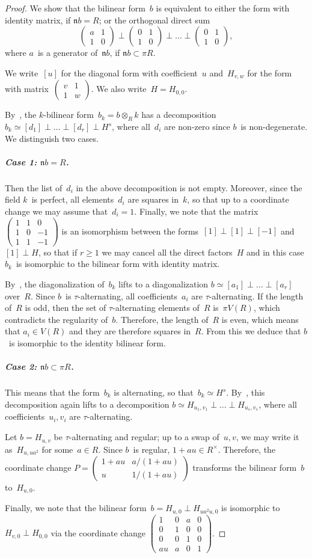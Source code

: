 \documentclass{article}
\def\mat#1{\begin{pmatrix}#1\end{pmatrix}}
\let\fr\mathfrak
\begin{document}
\begin{proof}
We show that the bilinear form~$b$ is equivalent to either the form with
identity matrix, if $\fr n b = R$; or the orthogonal direct sum
\[ \mat{a & 1\\1&0} ⟂ \mat{0 & 1\\1&0} ⟂ … ⟂ \mat {0 & 1\\ 1 & 0}, \]
where $a$~is a generator of~$\fr n b$, if $\fr n b ⊂ π R$.

We write~$[u]$ for the diagonal form with coefficient~$u$ and~$H_{v, w}$ for
the form with matrix~$\mat{v&1\\1&w}$. We also write~$H = H_{0,0}$.

By~\cite[§2]{milnor2}, the $k$-bilinear form~$b_k = b ⊗_R k$ has a
decomposition~$b_k ≃ [d_1] ⟂ … ⟂ [d_r] ⟂ H^s$, where all~$d_i$ are
non-zero since $b$~is non-degenerate. We distinguish two cases.

\subparagraph{Case 1: $\fr n b = R$.}
Then the list of~$d_i$ in the above
decomposition is not empty. Moreover, since the field $k$~is perfect, all
elements~$d_i$ are squares in~$k$, so that up to a coordinate change we
may assume that~$d_i = 1$. Finally, we note that the
matrix~$\mat{1&1&0\\1&0&-1\\1&1&-1}$ is an isomorphism between the
forms~$[1] ⟂ [1] ⟂ [-1]$ and~$[1] ⟂ H$, so that if $r ≥ 1$ we may cancel
all the direct factors~$H$ and in this case $b_k$~is isomorphic to the
bilinear form with identity matrix.

By~\cite[Corollary 3.4]{baeza}, the diagonalization of~$b_k$ lifts to a
diagonalization $b ≃ [a_1] ⟂ … ⟂ [a_r]$ over~$R$. Since $b$~is
$τ$-alternating, all coefficients~$a_i$ are $τ$-alternating. If the
length of~$R$ is odd, then the set of $τ$-alternating elements of~$R$
is~$π V(R)$, which contradicts the regularity of~$b$. Therefore, the
length of~$R$ is even, which means that $a_i ∈ V(R)$ and they are
therefore squares in~$R$. From this we deduce that $b$~is isomorphic to
the identity bilinear form.

\subparagraph{Case 2: $\fr n b ⊂ π R$.}
This means that the form~$b_k$ is alternating, so that~$b_k ≃ H^s$.
By~\cite[Corollary 3.4]{baeza}, this decomposition again lifts to a
decomposition $b ≃ H_{u_1, v_1} ⟂ … ⟂ H_{u_s, v_s}$, where all
coefficients~$u_i, v_i$ are $τ$-alternating.

Let $b = H_{u,v}$ be $τ$-alternating and regular; up to a swap of~$u, v$, we
may write it as~$H_{u, u a^2}$ for some~$a ∈ R$. Since $b$~is
regular, $1 + a u ∈ R^{×}$. Therefore, the coordinate
change $P = \mat{1+a u & a/(1+a u) \\ u & 1/(1+a u)}$ transforms the
bilinear form~$b$ to~$H_{u, 0}$.

Finally, we note that the bilinear form~$b = H_{u, 0} ⟂ H_{u a^2 u, 0}$ is
isomorphic to~$H_{v, 0} ⟂ H_{0,0}$ via the coordinate change
$\mat{1 & 0 & a & 0\\0&1&0&0\\0&0&1&0\\au & a & 0 & 1}$.
\end{proof}
\end{document}
